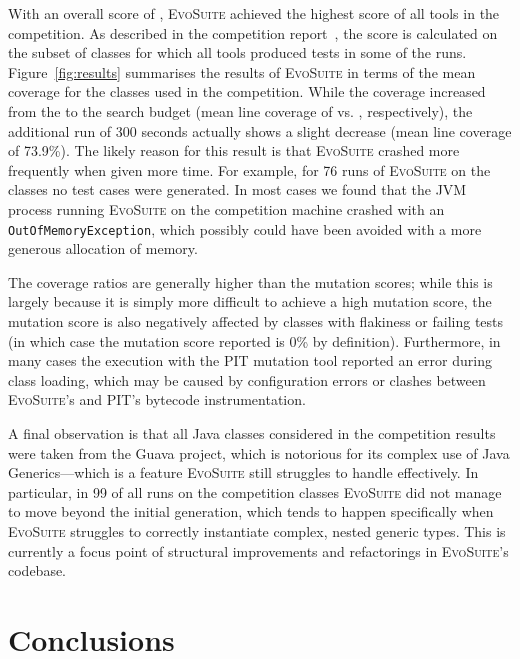 \documentclass[sigconf,review,anonymous]{acmart}
\newcommand{\EVOSUITE}{\textsc{EvoSuite}\xspace}
\begin{document}
With an overall score of \score, \EVOSUITE achieved the highest score of all
tools in the competition. As described in the competition
report~\cite{SBST-toolcomp22}, the score is calculated on the subset of \cuts classes
for which all tools produced tests in some of the runs.
Figure~\ref{fig:results} summarises the results of \EVOSUITE in terms of the
mean coverage for the \cuts classes used in the competition. While the coverage
increased from the \budgetShort to the \budgetLong search budget (mean line
coverage of \avgLinesCoverageRatioShort vs. \avgLinesCoverageRatioLong, respectively),
the additional run of 300 seconds
actually shows a slight decrease (mean line coverage of 73.9\%). The likely
reason for this result is that \EVOSUITE crashed more frequently when given
more time. For example, for 76 runs of \EVOSUITE on the \cuts classes no test
cases were generated. In most cases we found that the JVM process running
\EVOSUITE on the competition machine crashed with an
\texttt{OutOfMemoryException}, which possibly could have been avoided with a
more generous allocation of memory.

The coverage ratios are generally higher than the mutation scores; while this is largely because it is simply more difficult to achieve a high mutation score, the mutation score is also negatively affected by classes with flakiness or failing tests (in which case the mutation score reported is 0\% by definition). Furthermore, in many cases the execution with the PIT mutation tool reported an error during class loading, which may be caused by configuration errors or clashes between \EVOSUITE's and PIT's bytecode instrumentation.


A final observation is that all \cuts Java classes considered in the competition
results were taken from the Guava project, which is notorious for its complex
use of Java Generics---which is a feature \EVOSUITE still struggles to handle
effectively. In particular, in 99 of all runs on the \cuts competition classes
\EVOSUITE did not manage to move beyond the initial generation, which tends to
happen specifically when \EVOSUITE struggles to correctly instantiate complex,
nested generic types. This is currently a focus point of structural
improvements and refactorings in \EVOSUITE's codebase.






\section{Conclusions}
\end{document}

